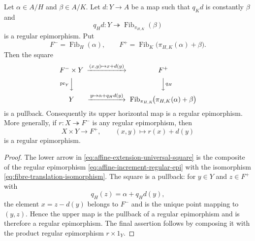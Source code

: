 \begin{lemma}\label{lem:affine-torsor-extension}
Let $\alpha\in A/H$ and $\beta\in A/K$.  Let $d:Y\to A$ be a map such that $q_Kd$ is constantly $\beta$ and
\begin{equation}\label{eq:affine-increment-regular-epi}
q_Hd:Y\twoheadrightarrow\operatorname{Fib}_{\pi_{H,K}}(\beta)
\end{equation}
is a regular epimorphism.  Put
\[
F^- = \operatorname{Fib}_H(\alpha),
\qquad
F^+ = \operatorname{Fib}_K\!\bigl(\pi_{H,K}(\alpha)+\beta\bigr).
\]
Then the square
\begin{equation}\label{eq:affine-extension-universal-square}
\begin{CD}
F^-\times Y @>{(x,y)\mapsto x+d(y)}>> F^+\\
@V{\mathrm{pr}_Y}VV @VV{q_H}V\\
Y @>{y\mapsto\alpha+q_Hd(y)}>>
\operatorname{Fib}_{\pi_{H,K}}\!\bigl(\pi_{H,K}(\alpha)+\beta\bigr)
\end{CD}
\end{equation}
is a pullback.  Consequently its upper horizontal map is a regular epimorphism.  More generally, if $r:X\twoheadrightarrow F^-$ is any regular epimorphism, then
\[
X\times Y\longrightarrow F^+,
\qquad
(x,y)\longmapsto r(x)+d(y)
\]
is a regular epimorphism.
\end{lemma}

\begin{proof}
The lower arrow in \eqref{eq:affine-extension-universal-square} is the composite of the regular epimorphism \eqref{eq:affine-increment-regular-epi} with the isomorphism \eqref{eq:fibre-translation-isomorphism}.  The square is a pullback: for $y\in Y$ and $z\in F^+$ with
\[
q_H(z)=\alpha+q_Hd(y),
\]
the element $x=z-d(y)$ belongs to $F^-$ and is the unique point mapping to $(y,z)$.  Hence the upper map is the pullback of a regular epimorphism and is therefore a regular epimorphism.  The final assertion follows by composing it with the product regular epimorphism $r\times1_Y$.
\end{proof}

